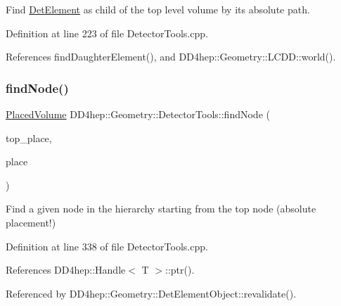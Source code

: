 Find \hyperlink{class_d_d4hep_1_1_geometry_1_1_det_element}{Det\+Element} as child of the top level volume by it\textquotesingle{}s absolute path. 



Definition at line 223 of file Detector\+Tools.\+cpp.



References find\+Daughter\+Element(), and D\+D4hep\+::\+Geometry\+::\+L\+C\+D\+D\+::world().

\hypertarget{namespace_d_d4hep_1_1_geometry_1_1_detector_tools_a82d2f181b2755d1fbd749c30b7dd21c1}{}\label{namespace_d_d4hep_1_1_geometry_1_1_detector_tools_a82d2f181b2755d1fbd749c30b7dd21c1} 
\subsubsection{\texorpdfstring{find\+Node()}{findNode()}}
{\footnotesize\ttfamily \hyperlink{class_d_d4hep_1_1_geometry_1_1_placed_volume}{Placed\+Volume} D\+D4hep\+::\+Geometry\+::\+Detector\+Tools\+::find\+Node (\begin{DoxyParamCaption}\item[{\hyperlink{class_d_d4hep_1_1_geometry_1_1_placed_volume}{Placed\+Volume}}]{top\+\_\+place,  }\item[{const std\+::string \&}]{place }\end{DoxyParamCaption})}



Find a given node in the hierarchy starting from the top node (absolute placement!) 



Definition at line 338 of file Detector\+Tools.\+cpp.



References D\+D4hep\+::\+Handle$<$ T $>$\+::ptr().



Referenced by D\+D4hep\+::\+Geometry\+::\+Det\+Element\+Object\+::revalidate().

\hypertarget{namespace_d_d4hep_1_1_geometry_1_1_detector_tools_a9e02ef062540b4e9c0d284f50106f203}{}\label{namespace_d_d4hep_1_1_geometry_1_1_detector_tools_a9e02ef062540b4e9c0d284f50106f203} 
